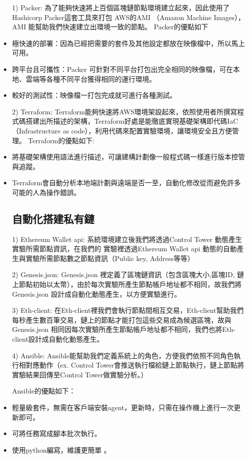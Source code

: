 \begin{itemize}%
\item [1)] Packer: 為了能夠快速將上百個區塊鏈節點環境建立起來，因此使用了Hashicorp Packer這套工具來打包 AWS的AMI （Amazon Machine Images），AMI 能幫助我們快速建立出環境一致的節點。
Packer的優點如下

\item 極快速的部署：因為已經把需要的套件及其他設定都放在映像檔中，所以馬上可用。

\item 跨平台且可攜性：Packer 可針對不同平台打包出完全相同的映像檔，可在本地、雲端等各種不同平台獲得相同的運行環境。

\item 較好的測試性：映像檔一打包完成就可進行各種測試。

\item [2)] Terraform: Terraform能夠快速將AWS環境架設起來，依照使用者所撰寫程式碼搭建出所描述的架構，Terraform好處是能徹底實現基礎架構即代碼IaC （Infrastructure as code），利用代碼來配置實驗環境，讓環境安全且方便管理。
Terraform的優點如下:
\item   將基礎架構使用語法進行描述，可讓建構計劃像一般程式碼一樣進行版本控管與追蹤。 

\item Terraform會自動分析本地端計劃與遠端是否一至，自動化修改從而避免許多可能的人為操作錯誤。

\subsection{自動化搭建私有鏈}\label{se_5} 

\item [1)] Ethereum Wallet api: 系統環境建立後我們將透過Control Tower 動態產生實驗所需節點資訊，在我們的 實驗裡透過Ethereum Wallet api 動態的自動產生與實驗所需節點數之節點資訊（Public key, Address等等）

\item [2)] Genesis.json: Genesis.json 裡定義了區塊鏈資訊（包含區塊大小,區塊ID, 鏈上節點初始以太幣），由於每次實驗所產生節點帳戶地址都不相同，故我們將Genesis.json 設計成自動化動態產生，以方便實驗進行。 

\item [3)]Eth-client: 在Eth-client裡我們會執行節點間相互交易，Eth-client幫助我們每秒產生數百筆交易，鏈上的節點才能打包這些交易成為候選區塊，故與Genesis.json 相同因每次實驗所產生節點帳戶地址都不相同，我們也將Eth-client設計成自動化動態產生。 

\item [4)] Ansible: Ansible能幫助我們定義系統上的角色，方便我們依照不同角色執行相對應動作（ex. Control Tower會推送執行檔給鏈上節點執行，鏈上節點將實驗結果回傳至Control Tower做實驗分析。）

Ansible的優點如下：

\item 輕量級套件，無需在客戶端安裝agent，更新時，只需在操作機上進行一次更新即可。

\item 可將任務寫成腳本批次執行。

\item 使用python編寫，維護更簡單 。
\end{itemize}